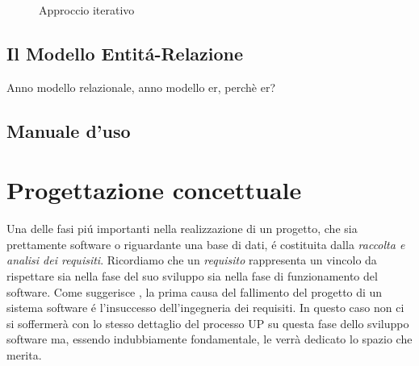 \documentclass[12pt,a4paper,onecolumn,x11names]{article}
\begin{document}
\begin{flushleft}
			\begin{center}
			\begin{figure}[h]
				\centering{}
				\caption{Approccio iterativo}
			\end{figure}
		\end{center}
		
		
		\newpage
	\end{flushleft}
\subsection{Il Modello Entit\'{a}-Relazione}
	\begin{flushleft}
		Anno modello relazionale, anno modello er, perchè er?
	\end{flushleft}

\subsection{Manuale d'uso}
\newpage


\section{Progettazione concettuale}

	Una delle fasi pi\'{u} importanti nella realizzazione di un progetto, che sia prettamente software o riguardante una base di dati, \'{e} costituita dalla \textit{raccolta e analisi dei requisiti}. Ricordiamo che un \textit{requisito} rappresenta un vincolo da rispettare sia nella fase del suo sviluppo sia nella fase di funzionamento del software. Come suggerisce \cite{Arlow}, la prima causa del fallimento del progetto di un sistema software \'{e} l'insuccesso dell'ingegneria dei requisiti. In questo caso non ci si soffermerà con lo stesso dettaglio del processo UP su questa fase dello sviluppo software ma, essendo indubbiamente fondamentale, le verrà dedicato lo spazio che merita.
	\newline
	
\end{document}

